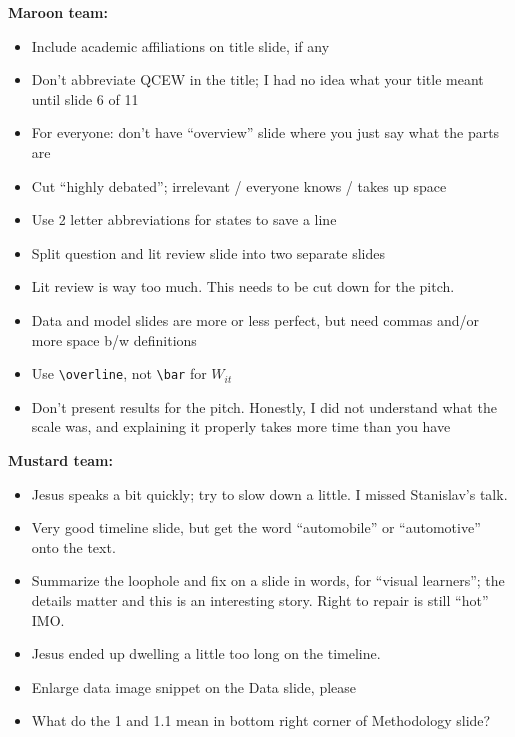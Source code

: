 \documentclass[12pt,pdftex,letterpaper]{article}
\begin{document}
\noindent \textbf{Maroon team:}
\begin{itemize}
	\item Include academic affiliations on title slide, if any
	
	\item Don't abbreviate QCEW in the title; I had no idea what your title meant until slide 6 of 11
	
	\item For everyone: don't have ``overview'' slide where you just say what the parts are
	
	\item Cut ``highly debated''; irrelevant / everyone knows / takes up space
	
	\item Use 2 letter abbreviations for states to save a line
	
	\item Split question and lit review slide into two separate slides
	
	\item Lit review is way too much. This needs to be cut down for the pitch.
	
	\item Data and model slides are more or less perfect, but need commas and/or more space b/w definitions
	
	\item Use \texttt{\textbackslash overline}, not \texttt{\textbackslash bar} for $W_{it}$
	
	\item Don't present results for the pitch. Honestly, I did not understand what the scale was, and explaining it properly takes more time than you have
\end{itemize}


\vspace{0.5cm}

\noindent \textbf{Mustard team:}
\begin{itemize}
	\item Jesus speaks a bit quickly; try to slow down a little. I missed Stanislav's talk.
	
	\item Very good timeline slide, but get the word ``automobile'' or ``automotive'' onto the text.
	
	\item Summarize the loophole and fix on a slide in words, for ``visual learners''; the details matter and this is an interesting story. Right to repair is still ``hot'' IMO.
	
	\item Jesus ended up dwelling a little too long on the timeline.
	
	\item Enlarge data image snippet on the Data slide, please
	
	\item What do the 1 and 1.1 mean in bottom right corner of Methodology slide?
\end{itemize}
\end{document}
